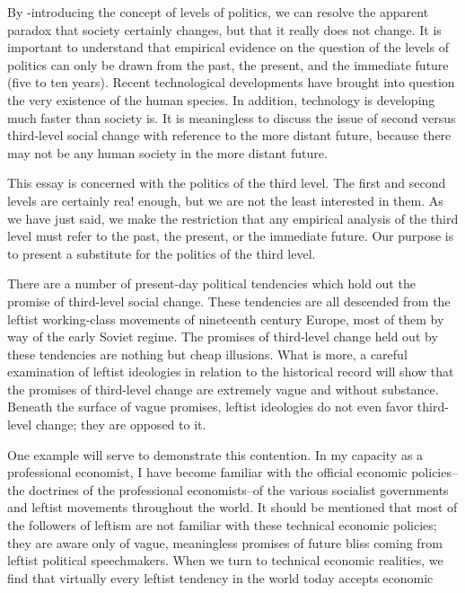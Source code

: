 \documentclass[10pt,twoside]{memoir}
\begin{document}
\begin{enumerate}
{\begin{enumerate}
\begin{sysrules}
\begin{sysrules}
\begin{sysrules}
\begin{sysrules}
{\begin{enumerate}
{{{{{{{{By -introducing the concept of levels of politics, we can resolve the 
apparent paradox that society certainly changes, but that it really does not 
change. It is important to understand that empirical evidence on the 
question of the levels of politics can only be drawn from the past, the 
present, and the immediate future (five to ten years). Recent technological 
developments have brought into question the very existence of the human 
species. In addition, technology is developing much faster than society is. It 
is meaningless to discuss the issue of second versus third-level social change 
with reference to the more distant future, because there may not be any 
human society in the more distant future. 

This essay is concerned with the politics of the third level. The first and 
second levels are certainly rea! enough, but we are not the least interested in 
them. As we have just said, we make the restriction that any empirical 
analysis of the third level must refer to the past, the present, or the 
immediate future. Our purpose is to present a substitute for the politics of 
the third level. 

There are a number of present-day political tendencies which hold out 
the promise of third-level social change. These tendencies are all descended 
from the leftist working-class movements of nineteenth century Europe, 
most of them by way of the early Soviet regime. The promises of third-level 
change held out by these tendencies are nothing but cheap illusions. What is 
more, a careful examination of leftist ideologies in relation to the historical 
record will show that the promises of third-level change are extremely vague 
and without substance. Beneath the surface of vague promises, leftist 
ideologies do not even favor third-level change; they are opposed to it. 

One example will serve to demonstrate this contention. In my capacity 
as a professional economist, I have become familiar with the official 
economic policies--the doctrines of the professional economists--of the 
various socialist governments and leftist movements throughout the world. It 
should be mentioned that most of the followers of leftism are not familiar 
with these technical economic policies; they are aware only of vague, 
meaningless promises of future bliss coming from leftist political 
speechmakers. When we turn to technical economic realities, we find that 
virtually every leftist tendency in the world today accepts economic 


}}}}}}}}
\end{enumerate}}
\end{sysrules}
\end{sysrules}
\end{sysrules}
\end{sysrules}
\end{enumerate}}
\end{enumerate}
\end{document}
